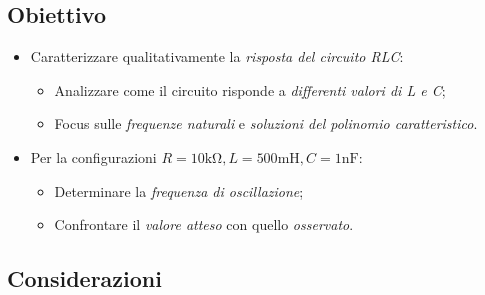 \documentclass[a4paper,10pt]{article}
\begin{document}
\begin{multicols}{2}
\subsection{Obiettivo}

\begin{itemize}
    \item Caratterizzare qualitativamente la \textit{risposta del circuito RLC}:
        \begin{itemize}
            \item Analizzare come il circuito risponde a \textit{differenti valori di L e C};
            \item Focus sulle \textit{frequenze naturali} e \textit{soluzioni del polinomio caratteristico}.
        \end{itemize}
    \item Per la configurazioni \(R = 10 \si{\kilo \ohm}, L = 500 \si{\milli \henry}, C = 1 \si{\nano \farad}\):
        \begin{itemize}
            \item Determinare la \textit{frequenza di oscillazione};
            \item Confrontare il \textit{valore atteso} con quello \textit{osservato}.
        \end{itemize}
\end{itemize}

\end{multicols}


\subsection{Considerazioni}
\end{document}

